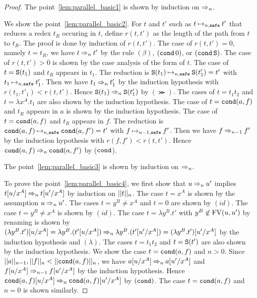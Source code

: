 \begin{proof}
  The point~\ref{lem:parallel_basic1} is shown by induction on $\nsafePReduces{n}$.
  
  We show the point~\ref{lem:parallel_basic2}.
  For $t$ and $t'$ such as $t\nsafeReduces{n} t'$
  that reduces a redex $t_R$ occuring in $t$, 
  define $r(t,t')$ as the length of the path from $t$ to $t_R$.
  The proof is done by induction of $r(t,t')$.
  The case of $r(t,t') = 0$, namely $t = t_R$,
  we have $t \nsafePReduces{n} t'$ by the rule $(\beta)$, $(\cond\,0)$,
  or $(\cond\,\Succ)$. 
  The case of $r(t,t') > 0$ is shown by the case analysis of the form of $t$.
  The case of $t=\Suc{t_1}$ and $t_R$ appears in $t_1$.
  The reduction is $\Suc{t_1} \nsafeReduces{n} \Suc{t'_1} = t'$ with $t_1 \nsafeReduces{n} t'_1$. 
  Then we have $t_1 \nsafePReduces{n} t'_1$ by the induction hypothesis with $r(t_1,t'_1) < r(t,t')$.
  Hence $\Suc{t_1} \nsafePReduces{n} \Suc{t'_1}$ by $(\Succ)$. 
  The cases of $t=t_1t_2$ and $t=\lambda x^A.t_1$ are also shown by the induction hypothesis. 
  The case of $t=\Cond{a}{f}$ and $t_R$ appears in $a$ is shown by the induction hypothesis.
  The case of $t=\Cond{a}{f}$ and $t_R$ appears in $f$.
  The reduction is $\Cond{a}{f} \nsafeReduces{n} \Cond{a}{f'} = t'$ with $f \nsafeReduces{n-1} f'$. 
  Then we have $f \nsafePReduces{n-1} f'$ by the induction hypothesis with $r(f,f') < r(t,t')$.
  Hence $\Cond{a}{f} \nsafePReduces{n} \Cond{a}{f'}$ by ($\cond$).

  The point~\ref{lem:parallel_basic3} is shown by induction on $\nsafePReduces{n}$. 

  To prove the point~\ref{lem:parallel_basic4}, we first show that
  $u \nsafePReduces{n} u'$ implies $t[u/x^A] \nsafePReduces{n} t[u'/x^A]$ by induction on $\Lv{n}{t}$.
  The case $t=x^A$ is shown by the assumption $u \nsafePReduces{n} u'$.
  The cases $t=y^B\neq x^A$ and $t=0$ are shown by $(id)$. 
  The case $t=y^B\neq x^A$ is shown by $(id)$.   
  The case $t=\lambda y^B.t'$ with $y^B\not\in\FV(u,u')$ by renaming is shown by
  $(\lambda y^B.t')[u/x^A] = \lambda y^B.(t'[u/x^A]) \nsafePReduces{n} \lambda y^B.(t'[u'/x^A]) = (\lambda y^B.t')[u'/x^A]$ by the induction hypothesis and $(\lambda)$.
  The cases $t=t_1t_2$ and $t=\Suc{t'}$ are also shown by the induction hypothesis.
  We show the case $t=\Cond{a}{f}$ and $n>0$. 
  Since $\Lv{n-1}{a}, \Lv{n}{f} < \Lv{n}{\Cond{a}{f}}$, 
  we have $a[u/x^A] \nsafePReduces{n} a[u'/x^A]$ and $f[u/x^A] \nsafePReduces{n-1} f[u'/x^A]$
  by the induction hypothesis. Hence $\Cond{a}{f}[u/x^A] \nsafePReduces{n} \Cond{a}{f}[u'/x^A]$ by $(\cond)$. 
  The case $t=\Cond{a}{f}$ and $n=0$ is shown similarly. 


\end{proof}
